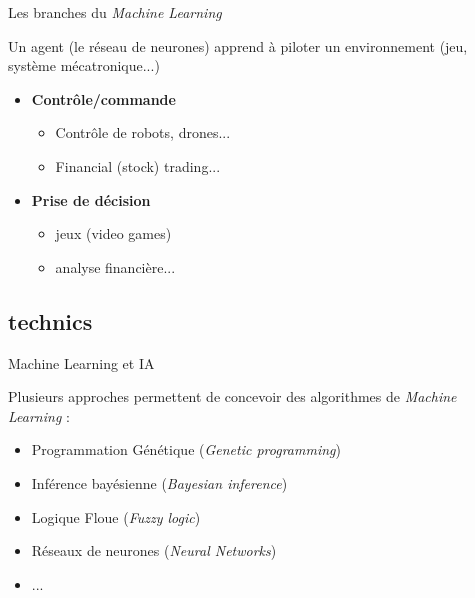 \documentclass[10pt,serif,mathserif,compress,hyperref={colorlinks}]{beamer}
\begin{document}
\begin{frame}{Les branches du {\em Machine Learning}}
  \begin{tcolorbox}[title={\em Reinforcement learning}\\Apprentissage par renforcement]
    Un agent (le réseau de neurones) apprend à piloter un environnement (jeu, système mécatronique...)
    \begin{itemize}
    \item \textbf{Contrôle/commande}
      \begin{itemize}
      \item Contrôle de robots, drones...
      \item Financial (stock) trading...
      \end{itemize}        
    \item \textbf{Prise de décision}
      \begin{itemize}
      \item jeux (video games)
      \item analyse financière...
      \end{itemize}
    \end{itemize}
  \end{tcolorbox}    
\end{frame}

\subsection{technics}

\begin{frame}{Machine Learning et IA}

  Plusieurs approches permettent de concevoir des algorithmes de {\em Machine Learning} :
    \begin{itemize}
    \item Programmation Génétique ({\em Genetic programming})
    \item Inférence bayésienne ({\em Bayesian inference})
    \item Logique Floue ({\em Fuzzy logic})
    \item Réseaux de neurones ({\em Neural Networks})
    \item ...
    \end{itemize}    

    \bigskip
\end{frame}
\end{document}
